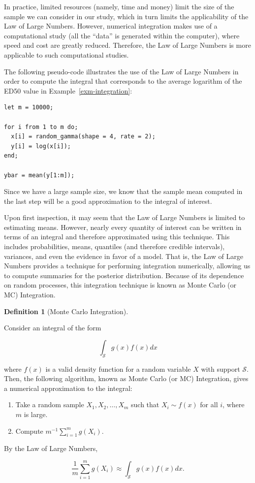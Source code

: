 \documentclass[
  letterpaper,
  DIV=11,
  numbers=noendperiod]{scrreprt}
\providecommand{\tightlist}{%
  \setlength{\itemsep}{0pt}\setlength{\parskip}{0pt}}\usepackage{longtable,booktabs,array}
\theoremstyle{definition}
\theoremstyle{definition}
\newtheorem{definition}{Definition}[chapter]
\theoremstyle{plain}
\theoremstyle{remark}
\begin{document}
In practice, limited resources (namely, time and money) limit the size
of the sample we can consider in our study, which in turn limits the
applicability of the Law of Large Numbers. However, numerical
integration makes use of a computational study (all the ``data'' is
generated within the computer), where speed and cost are greatly
reduced. Therefore, the Law of Large Numbers is more applicable to such
computational studies.

The following pseudo-code illustrates the use of the Law of Large
Numbers in order to compute the integral that corresponds to the average
logarithm of the ED50 value in Example~\ref{exm-integration}:

\begin{verbatim}
let m = 10000;

for i from 1 to m do;
  x[i] = random_gamma(shape = 4, rate = 2);
  y[i] = log(x[i]);
end;
  
ybar = mean(y[1:m]);
\end{verbatim}

Since we have a large sample size, we know that the sample mean computed
in the last step will be a good approximation to the integral of
interest.

Upon first inspection, it may seem that the Law of Large Numbers is
limited to estimating means. However, nearly every quantity of interest
can be written in terms of an integral and therefore approximated using
this technique. This includes probabilities, means, quantiles (and
therefore credible intervals), variances, and even the evidence in favor
of a model. That is, the Law of Large Numbers provides a technique for
performing integration numerically, allowing us to compute summaries for
the posterior distribution. Because of its dependence on random
processes, this integration technique is known as Monte Carlo (or MC)
Integration.

\begin{definition}[Monte Carlo
Integration]\protect\hypertarget{def-mc-integration}{}\label{def-mc-integration}

Consider an integral of the form

\[\int_{\mathcal{S}} g(x) f(x) dx\]

where \(f(x)\) is a valid density function for a random variable \(X\)
with support \(\mathcal{S}\). Then, the following algorithm, known as
Monte Carlo (or MC) Integration, gives a numerical approximation to the
integral:

\begin{enumerate}
\def\labelenumi{\arabic{enumi}.}
\tightlist
\item
  Take a random sample \(X_1, X_2, \dotsc, X_m\) such that
  \(X_i \sim f(x)\) for all \(i\), where \(m\) is large.
\item
  Compute \(m^{-1} \sum_{i=1}^{m} g\left(X_i\right)\).
\end{enumerate}

By the Law of Large Numbers,

\[\frac{1}{m} \sum_{i=1}^{m} g\left(X_i\right) \approx \int_{\mathcal{S}} g(x) f(x) dx.\]

\end{definition}
\end{document}
